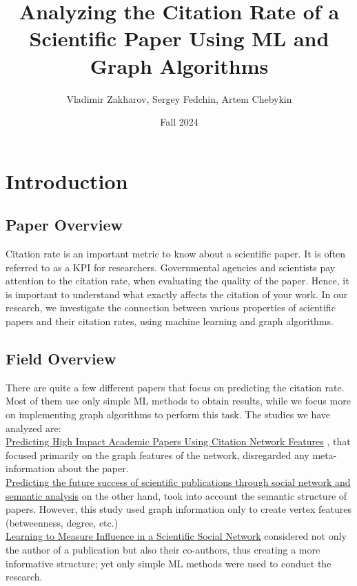 \documentclass{article}
\title{Analyzing the Citation Rate of a Scientific Paper Using ML and Graph Algorithms}
\author{Vladimir Zakharov, Sergey Fedchin, Artem Chebykin}
\date{Fall 2024}
\newcommand\tab[1][1cm]{\hspace*{#1}}
\begin{document}
\maketitle

\section{Introduction}

\subsection{Paper Overview}

\tab Citation rate is an important metric to know about a scientific paper. It is often referred to as a KPI for researchers. Governmental agencies and scientists pay attention to the citation rate, when evaluating the quality of the paper. Hence, it is important to understand what exactly affects the citation of your work. In our research, we investigate the connection between various properties of scientific papers and their citation rates, using machine learning and graph algorithms. \\

\subsection{Field Overview}
\tab There are quite a few different papers that focus on predicting the citation rate. Most of them use only simple ML methods to obtain results, while we focus more on implementing graph algorithms to perform this task. The studies we have analyzed are: \\

\tab \href{https://link.springer.com/chapter/10.1007/978-3-642-40319-4_2?fromPaywallRec=false}{Predicting High Impact Academic Papers Using Citation Network Features} , that focused primarily on the graph features of the network, disregarded any meta-information about the paper.\\

\tab \href{https://link.springer.com/article/10.1007/s11192-020-03479-5?fromPaywallRec=true}{Predicting the future success of scientific publications through social network and semantic analysis} on the other hand, took into account the semantic structure of papers. However, this study used graph information only to create vertex features (betweenness, degree, etc.)\\

\tab \href{https://link.springer.com/chapter/10.1007/978-3-319-06483-3_4?fromPaywallRec=true}{Learning to Measure Influence in a Scientific Social Network} considered not only the author of a publication but also their co-authors, thus creating a more informative structure; yet only simple ML methods were used to conduct the research.\\
\end{document}
